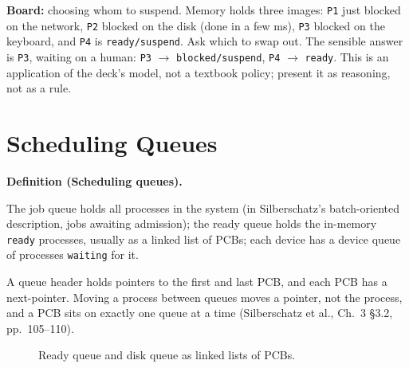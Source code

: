 \documentclass[11pt]{article}
\newenvironment{definitionbox}[1]{%
  \par\noindent\textbf{Definition (#1).}\ \itshape
}{\par\vspace{0.3em}}
\begin{document}
\textbf{Board:} choosing whom to suspend. Memory holds three images: \texttt{P1} just blocked on the network, \texttt{P2} blocked on the disk (done in a few ms), \texttt{P3} blocked on the keyboard, and \texttt{P4} is \texttt{ready/suspend}. Ask which to swap out. The sensible answer is \texttt{P3}, waiting on a human: \texttt{P3} $\to$ \texttt{blocked/suspend}, \texttt{P4} $\to$ \texttt{ready}. This is an application of the deck's model, not a textbook policy; present it as reasoning, not as a rule.

\section{Scheduling Queues}

\begin{definitionbox}{Scheduling queues}
The job queue holds all processes in the system (in Silberschatz's batch-oriented description, jobs awaiting admission); the ready queue holds the in-memory \texttt{ready} processes, usually as a linked list of PCBs; each device has a device queue of processes \texttt{waiting} for it.
\end{definitionbox}

A queue header holds pointers to the first and last PCB, and each PCB has a next-pointer. Moving a process between queues moves a pointer, not the process, and a PCB sits on exactly one queue at a time (Silberschatz et al., Ch.~3 \S3.2, pp.~105--110).

\begin{figure}[h]
\centering
{}
\caption{Ready queue and disk queue as linked lists of PCBs.}
\label{fig:h-lists}
\end{figure}
\end{document}
